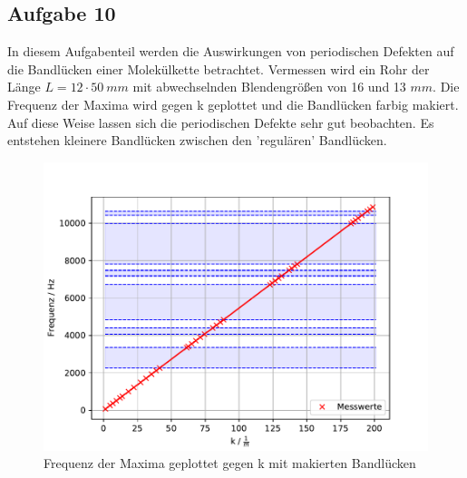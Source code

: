 \subsection{Aufgabe 10}
In diesem Aufgabenteil werden die Auswirkungen von periodischen Defekten auf die Bandlücken einer Molekülkette betrachtet.
Vermessen wird ein Rohr der Länge $L=12 \cdot \SI{50}{mm}$ mit abwechselnden Blendengrößen von 16 und 13 $\si{mm}$.
Die Frequenz der Maxima wird gegen k geplottet und die Bandlücken farbig makiert.
Auf diese Weise lassen sich die periodischen Defekte sehr gut beobachten.
Es entstehen kleinere Bandlücken zwischen den 'regulären' Bandlücken.
\begin{figure}[h!]
  \centering
  \includegraphics[width=1\textwidth]{A101.pdf}
  \caption{Frequenz der Maxima geplottet gegen k mit makierten Bandlücken}
  \label{fig.Aufgabe101}
\end{figure}
  \FloatBarrier



